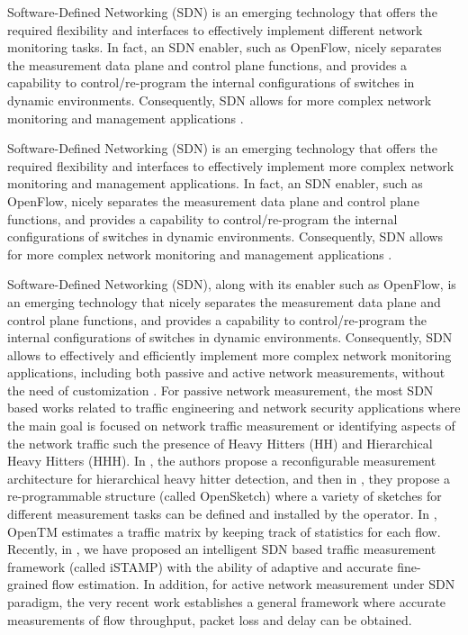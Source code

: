 



Software-Defined Networking (SDN) is an emerging technology that offers the required flexibility and interfaces to effectively implement different network monitoring tasks. In fact, an SDN enabler, such as OpenFlow, nicely separates the measurement data plane and control plane functions, and provides a capability to control/re-program the internal configurations of switches in dynamic environments. Consequently, SDN allows for more complex network monitoring and management applications \cite{IF14iSTAMP:2014} \cite{YLiao:2011} \cite{MYu:2011} \cite{MYu:2013}. %

Software-Defined Networking (SDN) is an emerging technology that offers the required flexibility and interfaces to effectively implement more complex network monitoring and management applications. In fact, an SDN enabler, such as OpenFlow, nicely separates the measurement data plane and control plane functions, and provides a capability to control/re-program the internal configurations of switches in dynamic environments. Consequently, SDN allows for more complex network monitoring and management applications \cite{IF14iSTAMP:2014} \cite{YLiao:2011} \cite{MYu:2011} \cite{MYu:2013}. %


Software-Defined Networking (SDN), along with its enabler such as OpenFlow, is an emerging technology that nicely separates the measurement data plane and control plane functions, and provides a capability to control/re-program the internal configurations of switches in dynamic environments. Consequently, SDN allows to effectively and efficiently implement more complex network monitoring applications, including both passive and active network measurements, without the need of customization \cite{IF14iSTAMP:2014} \cite{YLiao:2011} \cite{MYu:2011} \cite{MYu:2013}. For passive network measurement, the most SDN based works related to traffic engineering and network security applications where the main goal is focused on network traffic measurement or identifying aspects of the network traffic such the presence of Heavy Hitters (HH) and Hierarchical Heavy Hitters (HHH). In \cite{MYu:2011}, the authors propose a reconfigurable measurement architecture for hierarchical heavy hitter detection, and then in \cite{MYu:2013}, they propose a re-programmable structure (called OpenSketch) where a variety of sketches for different measurement tasks can be defined and installed by the operator. In \cite{Tootoonchian:2010}, OpenTM estimates a traffic matrix by keeping track of statistics for each flow. Recently, in \cite{IF14iSTAMP:2014}, we have proposed an intelligent SDN based traffic measurement framework (called iSTAMP) with the ability of adaptive and accurate fine-grained flow estimation. In addition, for active network measurement under SDN paradigm, the very recent work \cite{Adrichen:2014} establishes a general framework where accurate measurements of flow throughput, packet loss and delay can be obtained.





